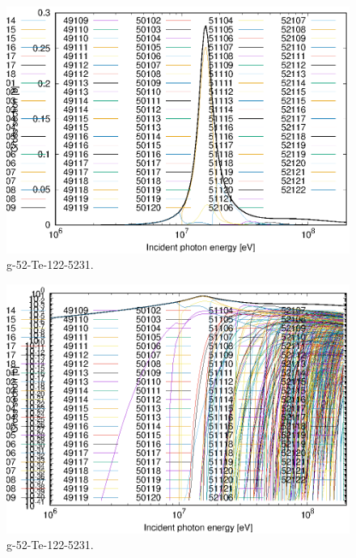 \begin{figure}
 \includegraphics[width=\linewidth]{eps/g_52-Te-122_5231.eps}
  \caption{g-52-Te-122-5231.}
\end{figure}
\begin{figure}
 \includegraphics[width=\linewidth]{eps-log/g_52-Te-122_5231.eps}
 \caption{g-52-Te-122-5231.}
\end{figure}
\newpage \clearpage


